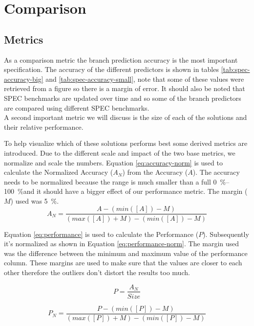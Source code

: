 
\section{Comparison}
\subsection{Metrics}
As a comparison metric the branch prediction accuracy is the most important specification.
The accuracy of the different predictors is shown in tables \ref{tab:spec-accuracy-big} and \ref{tab:spec-accuracy-small}, note that some of these values were retrieved from a figure so there is a margin of error.
It should also be noted that SPEC benchmarks are updated over time and so some of the branch predictors are compared using different SPEC benchmarks.\\
A second important metric we will discuss is the size of each of the solutions and their relative performance.

To help visualize which of these solutions performs best some derived metrics are introduced.
Due to the different scale and impact of the two base metrics, we normalize and scale the numbers.
Equation \ref{eq:accuracy-norm} is used to calculate the Normalized Accuracy ($A_N$) from the Accuracy ($A$).
The accuracy needs to be normalized because the range is much smaller than a full \SIrange{0}{100}{\percent}and it should have a bigger effect of our performance metric.
The margin ($M$) used was \SI{5}{\percent}.
\begin{equation}
\label{eq:accuracy-norm}
A_{N} = \frac{A - (min([A]) - M)}{(max([A]) + M)-(min([A]) - M)}
\end{equation}

Equation \ref{eq:performance} is used to calculate the Performance ($P$).
Subsequently it's normalized as shown in Equation \ref{eq:performance-norm}.
The margin used was the difference between the minimum and maximum value of the performance column.
These margins are used to make sure that the values are closer to each other therefore the outliers don't distort the results too much.

\begin{equation}
\label{eq:performance}
P = \frac{A_{N}}{Size}
\end{equation}

\begin{equation}
\label{eq:performance-norm}
P_{N} = \frac{P - (min([P]) - M)}{(max([P]) + M)-(min([P]) - M)}
\end{equation}


